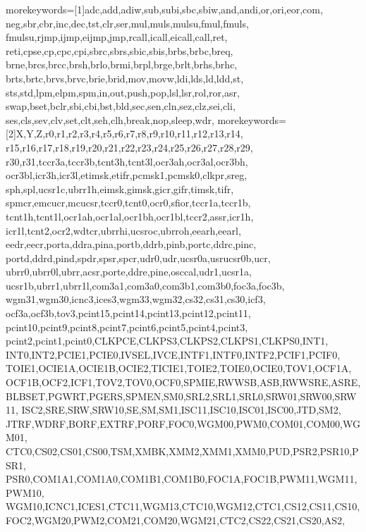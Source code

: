 
 {morekeywords=[1]{adc,add,adiw,sub,subi,sbc,sbiw,and,andi,or,ori,eor,com,
                neg,sbr,cbr,inc,dec,tst,clr,ser,mul,muls,mulsu,fmul,fmuls,
                fmulsu,rjmp,ijmp,eijmp,jmp,rcall,icall,eicall,call,ret,
                reti,cpse,cp,cpc,cpi,sbrc,sbrs,sbic,sbis,brbs,brbc,breq,
                brne,brcs,brcc,brsh,brlo,brmi,brpl,brge,brlt,brhs,brhc,
                brts,brtc,brvs,brvc,brie,brid,mov,movw,ldi,lds,ld,ldd,st,
                sts,std,lpm,elpm,spm,in,out,push,pop,lsl,lsr,rol,ror,asr,
                swap,bset,bclr,sbi,cbi,bst,bld,sec,sen,cln,sez,clz,sei,cli,
                ses,cls,sev,clv,set,clt,seh,clh,break,nop,sleep,wdr}, 
morekeywords=[2]{X,Y,Z,r0,r1,r2,r3,r4,r5,r6,r7,r8,r9,r10,r11,r12,r13,r14,
                r15,r16,r17,r18,r19,r20,r21,r22,r23,r24,r25,r26,r27,r28,r29,
                r30,r31,tccr3a,tccr3b,tcnt3h,tcnt3l,ocr3ah,ocr3al,ocr3bh,
                ocr3bl,icr3h,icr3l,etimsk,etifr,pcmsk1,pcmsk0,clkpr,sreg,
                sph,spl,ucsr1c,ubrr1h,eimsk,gimsk,gicr,gifr,timsk,tifr,
                spmcr,emcucr,mcucsr,tccr0,tcnt0,ocr0,sfior,tccr1a,tccr1b,
                tcnt1h,tcnt1l,ocr1ah,ocr1al,ocr1bh,ocr1bl,tccr2,assr,icr1h,
                icr1l,tcnt2,ocr2,wdtcr,ubrrhi,ucsroc,ubrroh,eearh,eearl,
                eedr,eecr,porta,ddra,pina,portb,ddrb,pinb,portc,ddrc,pinc,
                portd,ddrd,pind,spdr,spsr,spcr,udr0,udr,ucsr0a,usrucsr0b,ucr,
                ubrr0,ubrr0l,ubrr,acsr,porte,ddre,pine,osccal,udr1,ucsr1a,
                ucsr1b,ubrr1,ubrr1l,com3a1,com3a0,com3b1,com3b0,foc3a,foc3b,
                wgm31,wgm30,icnc3,ices3,wgm33,wgm32,cs32,cs31,cs30,icf3,
                ocf3a,ocf3b,tov3,pcint15,pcint14,pcint13,pcint12,pcint11,
                pcint10,pcint9,pcint8,pcint7,pcint6,pcint5,pcint4,pcint3,
                pcint2,pcint1,pcint0,CLKPCE,CLKPS3,CLKPS2,CLKPS1,CLKPS0,INT1,
                INT0,INT2,PCIE1,PCIE0,IVSEL,IVCE,INTF1,INTF0,INTF2,PCIF1,PCIF0,
                TOIE1,OCIE1A,OCIE1B,OCIE2,TICIE1,TOIE2,TOIE0,OCIE0,TOV1,OCF1A,
                OCF1B,OCF2,ICF1,TOV2,TOV0,OCF0,SPMIE,RWWSB,ASB,RWWSRE,ASRE,
                BLBSET,PGWRT,PGERS,SPMEN,SM0,SRL2,SRL1,SRL0,SRW01,SRW00,SRW11,
                ISC2,SRE,SRW,SRW10,SE,SM,SM1,ISC11,ISC10,ISC01,ISC00,JTD,SM2,
                JTRF,WDRF,BORF,EXTRF,PORF,FOC0,WGM00,PWM0,COM01,COM00,WGM01,
                CTC0,CS02,CS01,CS00,TSM,XMBK,XMM2,XMM1,XMM0,PUD,PSR2,PSR10,PSR1,
                PSR0,COM1A1,COM1A0,COM1B1,COM1B0,FOC1A,FOC1B,PWM11,WGM11,PWM10,
                WGM10,ICNC1,ICES1,CTC11,WGM13,CTC10,WGM12,CTC1,CS12,CS11,CS10,
                FOC2,WGM20,PWM2,COM21,COM20,WGM21,CTC2,CS22,CS21,CS20,AS2,
}}
